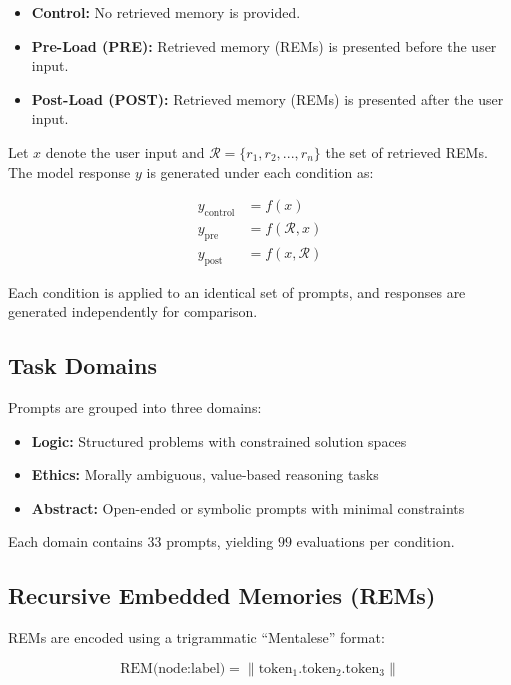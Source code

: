 \documentclass[11pt]{article}
\begin{document}
\begin{itemize}
\item \textbf{Control:} No retrieved memory is provided.
\item \textbf{Pre-Load (PRE):} Retrieved memory (REMs) is presented before the user input.
\item \textbf{Post-Load (POST):} Retrieved memory (REMs) is presented after the user input.
\end{itemize}

Let $x$ denote the user input and $\mathcal{R} = \{r_1, r_2, ..., r_n\}$ the set of retrieved REMs. The model response $y$ is generated under each condition as:

\begin{align}
y_{\text{control}} &= f(x) \\
y_{\text{pre}} &= f(\mathcal{R}, x) \\
y_{\text{post}} &= f(x, \mathcal{R})
\end{align}

Each condition is applied to an identical set of prompts, and responses are generated independently for comparison.

\subsection{Task Domains}

Prompts are grouped into three domains:

\begin{itemize}
\item \textbf{Logic:} Structured problems with constrained solution spaces
\item \textbf{Ethics:} Morally ambiguous, value-based reasoning tasks
\item \textbf{Abstract:} Open-ended or symbolic prompts with minimal constraints
\end{itemize}

Each domain contains $33$ prompts, yielding $99$ evaluations per condition.

\subsection{Recursive Embedded Memories (REMs)}

REMs are encoded using a trigrammatic “Mentalese” format:

\begin{equation}
\text{REM(node:label)} = \|\text{token}_1.\text{token}_2.\text{token}_3\|
\end{equation}
\end{document}
